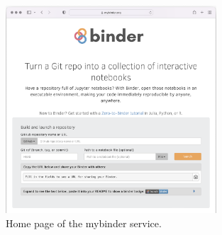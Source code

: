 \begin{figure}
  \centering
  \includegraphics[width=0.7\textwidth]{images/mybinder.png}
  \caption{Home page of the mybinder service.}
  \label{fig:mybinder-homepage}
\end{figure}

